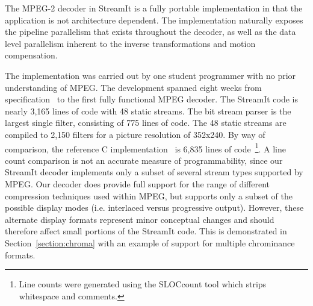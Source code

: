 The MPEG-2 decoder in StreamIt is a fully portable implementation in
that the application is not architecture dependent. The implementation
naturally exposes the pipeline parallelism that exists throughout the
decoder, as well as the data level parallelism inherent to the inverse
transformations and motion compensation.

The implementation was carried out by one student programmer with no
prior understanding of MPEG. The development spanned eight weeks from
specification~\cite{MPEG2} to the first fully functional MPEG
decoder. The StreamIt code is nearly 3,165 lines of code with 48
static streams. The bit stream parser is the largest single filter,
consisting of 775 lines of code. The 48 static streams are compiled to
2,150 filters for a picture resolution of 352x240. By way of
comparison, the reference C implementation~\cite{reference-mpeg-c} is
6,835 lines of code~\footnote{Line counts were generated using 
the SLOCcount tool which strips whitespace and comments.}.
A line count comparison is not an accurate
measure of programmability, since our StreamIt decoder 
implements only a subset of several stream types supported by MPEG.
Our decoder does provide full support for the range of different 
compression techniques used within MPEG, but supports only a subset 
of the possible display modes (i.e. interlaced versus progressive output).
However, these alternate display formats represent minor conceptual
changes and should therefore affect small portions of the StreamIt code. 
This is demonstrated in Section~\ref{section:chroma} with an example of
support for multiple chrominance formats. 

